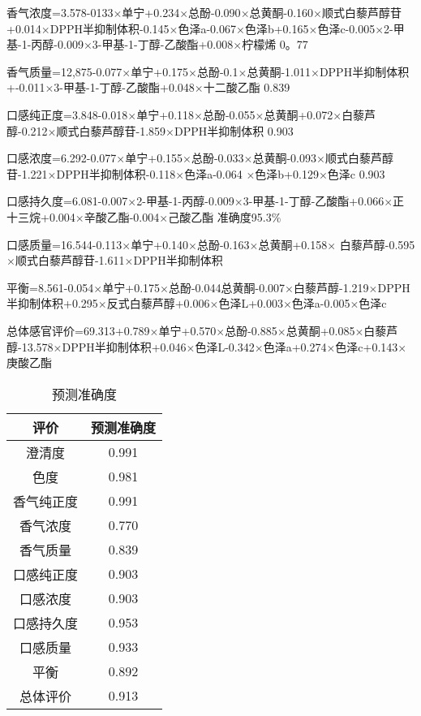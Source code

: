 \documentclass[UTF8,12.05pt]{ctexart}
\begin{document}
香气浓度=3.578-0133$\times$单宁+0.234$\times$总酚-0.090$\times$总黄酮-0.160$\times$顺式白藜芦醇苷+0.014$\times$DPPH半抑制体积-0.145$\times$色泽a-0.067$\times$色泽b+0.165$\times$色泽c-0.005$\times$2-甲基-1-丙醇-0.009$\times$3-甲基-1-丁醇-乙酸酯+0.008$\times$柠檬烯       0。77

香气质量=12,875-0.077$\times$单宁+0.175$\times$总酚-0.1$\times$总黄酮-1.011$\times$DPPH半抑制体积+-0.011$\times$3-甲基-1-丁醇-乙酸酯+0.048$\times$十二酸乙酯  0.839

口感纯正度=3.848-0.018$\times$单宁+0.118$\times$总酚-0.055$\times$总黄酮+0.072$\times$白藜芦醇-0.212$\times$顺式白藜芦醇苷-1.859$\times$DPPH半抑制体积        0.903

口感浓度=6.292-0.077$\times$单宁+0.155$\times$总酚-0.033$\times$总黄酮-0.093$\times$顺式白藜芦醇苷-1.221$\times$DPPH半抑制体积-0.118$\times$色泽a-0.064 $\times$色泽b+0.129$\times$色泽c  0.903

口感持久度=6.081-0.007$\times$2-甲基-1-丙醇-0.009$\times$3-甲基-1-丁醇-乙酸酯+0.066$\times$正十三烷+0.004$\times$辛酸乙酯-0.004$\times$己酸乙酯  准确度95.3$\%$

口感质量=16.544-0.113$\times$单宁+0.140$\times$总酚-0.163$\times$总黄酮+0.158$\times$
白藜芦醇-0.595$\times$顺式白藜芦醇苷-1.611$\times$DPPH半抑制体积

平衡=8.561-0.054$\times$单宁+0.175$\times$总酚-0.044总黄酮-0.007$\times$白藜芦醇-1.219$\times$DPPH半抑制体积+0.295$\times$反式白藜芦醇+0.006$\times$色泽L+0.003$\times$色泽a-0.005$\times$色泽c

总体感官评价=69.313+0.789$\times$单宁+0.570$\times$总酚-0.885$\times$总黄酮+0.085$\times$白藜芦醇-13.578$\times$DPPH半抑制体积+0.046$\times$色泽L-0.342$\times$色泽a+0.274$\times$色泽c+0.143$\times$庚酸乙酯

\begin{table}[H]
  \centering
  \begin{tabular}{|c|c|}
  \hline
  评价 & 预测准确度 \\ \hline
  澄清度 & 0.991 \\ \hline
  色度 & 0.981 \\ \hline
  香气纯正度 & 0.991 \\ \hline
  香气浓度 & 0.770 \\ \hline
  香气质量 & 0.839 \\ \hline
  口感纯正度 & 0.903\\ \hline
  口感浓度 & 0.903 \\ \hline
  口感持久度 & 0.953 \\ \hline
  口感质量 & 0.933 \\ \hline
  平衡 & 0.892 \\ \hline
  总体评价 & 0.913 \\
  \hline
\end{tabular}
  \caption{预测准确度}
\end{table}
\end{document}

